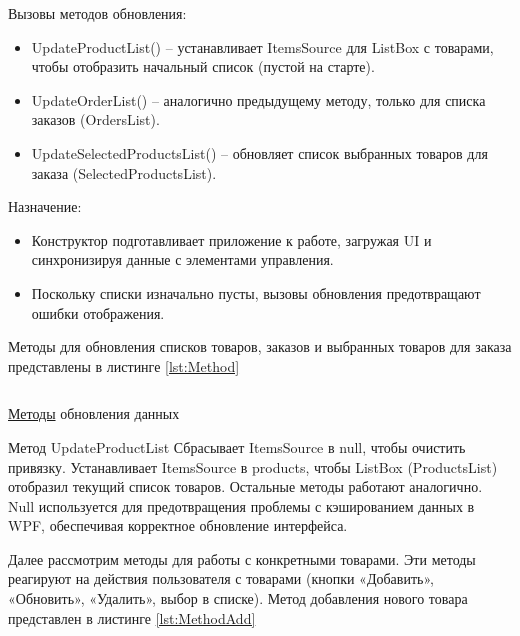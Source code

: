 \documentclass[12pt]{article}
\newcommand{\colorGIT}[1]{\textcolor{CtpLavender}{#1}}
\renewcommand{\texttt}[1]{{\small\ttfamily #1}}
\numberwithin{listing}{section}
\numberwithin{figure}{section}
\begin{document}
\noindent Вызовы методов обновления:
\begin{itemize}
	\item \texttt{UpdateProductList()} -- устанавливает \texttt{ItemsSource} для \texttt{ListBox} с товарами, чтобы отобразить начальный список (пустой на старте).
	\item \texttt{UpdateOrderList()} -- аналогично предыдущему методу, только для списка заказов (\texttt{Or\-dersList}).
	\item \texttt{UpdateSelectedProductsList()} -- обновляет список выбранных товаров для заказа (\texttt{Sel\-ected\-ProductsList}).
\end{itemize}

\noindent Назначение:
\begin{itemize}
	\item Конструктор подготавливает приложение к работе, загружая \texttt{UI} и синхронизируя данные с элементами управления.
	\item Поскольку списки изначально пусты, вызовы обновления предотвращают ошибки отображения.
\end{itemize}

Методы для обновления списков товаров, заказов и выбранных товаров для заказа
представлены в листинге \ref{lst:Method}

\begin{listing}[H]
	\inputminted[firstline=32, lastline=51]{csharp}{../../3lab/StoreManager/MainWindow.xaml.cs}
	\caption{\colorGIT{\href{https://github.com/WebMasterIT/Csharp_Labs/blob/ec375afd16c0647b337cf3d8a79c8bef904fc1be/3lab/StoreManager/MainWindow.xaml.cs\#L32-L51}{Методы}} обновления данных}
	\label{lst:Method}
\end{listing}

Метод \texttt{UpdateProductList} Сбрасывает \texttt{ItemsSource} в \texttt{null}, чтобы очистить привязку. Устанавливает \texttt{ItemsSource} в \texttt{products}, чтобы \texttt{ListBox} (\texttt{ProductsList}) отобразил текущий список товаров. Остальные методы работают аналогично. \texttt{Null} используется для предотвращения проблемы с кэшированием данных в \texttt{WPF}, обеспечивая корректное обновление интерфейса.

{}

Далее рассмотрим методы для работы с конкретными товарами. Эти методы реагируют на действия пользователя с товарами (кнопки «Добавить», «Обновить», «Удалить», выбор в списке). Метод добавления нового товара представлен в листинге \ref{lst:MethodAdd}
\end{document}
